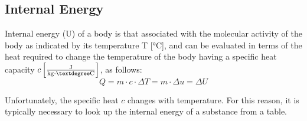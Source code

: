 \subsection{Internal Energy} \label{sec:ch1_internalEnergy}

Internal energy (U) of a body is that associated with the molecular activity of the body as indicated by its temperature T [°C], and can be evaluated in terms of the heat required to change the temperature of the body having a specific heat capacity  $c\left[\frac{\rm J}{\rm kg \cdot°C}\right]$, as follows:
\begin{equation}
  Q=m\cdot c\cdot\Delta T=m\cdot\Delta u=\Delta U
\end{equation}

Unfortunately, the specific heat $c$ changes with temperature.  For this reason, it is typically necessary to look up the internal energy of a substance from a table.

